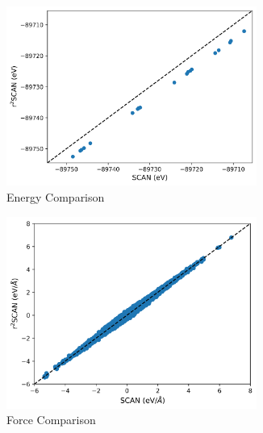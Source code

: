 \begin{figure}[tbhp]
	\centering
	\begin{subfigure}{0.48\textwidth}
		\centering

		\includegraphics[width=0.9\textwidth]{images/scan_vs_r2scan/energy_compare.png}
		\caption{Energy Comparison}
		\label{fig:scan_r2scan_E}
	\end{subfigure}
	\hfill
	\begin{subfigure}{0.48\textwidth}
		\centering

		\includegraphics[width=0.9\textwidth]{images/scan_vs_r2scan/force_compare.png}
		\caption{Force Comparison}
		\label{fig:scan_r2scan_F}
	\end{subfigure}
	\hfill
	\begin{subfigure}{0.9\textwidth}
		\centering


\end{subfigure}
\end{figure}
